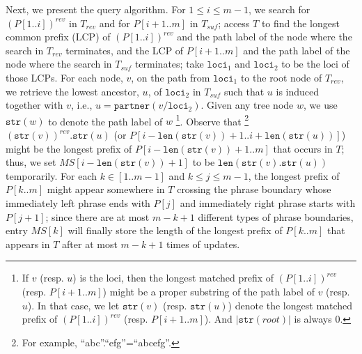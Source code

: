 \documentclass[smallabstract,smallcaptions]{dccpaper}
\def\idtt#1{\ensuremath{\mathtt{#1}}}
\def\str{\idtt{str}}
\def\partner{\idtt{partner}}
\def\loci{\idtt{loci}}
\def\len{\idtt{len}}
\begin{document}
	Next, we present the query algorithm.
	For $1\leq i\leq m-1$, we search for $(P[1..i])^{rev}$ in $T_{rev}$ and for $P[i+1..m]$ in $T_{suf}$; access $T$ to find the longest common prefix (LCP) of $(P[1..i])^{rev}$  and the path label of the node where the search in $T_{rev}$ terminates, and the LCP of $P[i+1..m]$ and the path label of the node where the search in $T_{suf}$ terminates; take $\loci_1$ and $\loci_2$ to be the loci of those LCPs.
	For each node, $v$, on the path from $\loci_1$ to the root node of $T_{rev}$, we retrieve the lowest ancestor, $u$, of $\loci_2$ in $T_{suf}$ such that $u$ is induced together with $v$, i.e., $u=\partner(v/\loci_2)$.
	Given any tree node $w$, we use $\str(w)$ to denote the path label of $w$ \footnote{If $v$ (resp. $u$) is the loci, then the longest matched prefix of $(P[1..i])^{rev}$ (resp. $P[i+1..m]$) might be a proper substring of the path label of $v$ (resp. $u$). In that case, we let $\str(v)$ (resp. $\str(u)$) denote the longest matched prefix of $(P[1..i])^{rev}$ (resp. $P[i+1..m]$). And $|\str(root)|$ is always 0.}.
	Observe that \footnote{For example, ``abc''.``efg''=``abcefg''.} $(\str(v))^{rev}.\str(u)$ (or $P[i-\len(\str(v))+1..i+\len(\str(u))]$) might be the longest prefix of $P[i-\len(\str(v))+1..m]$ that occurs in $T$; thus, we set $MS[i-\len(\str(v))+1]$ to be $\len(\str(v).\str(u))$ temporarily.
	For each $k\in[1..m-1]$ and $k\leq j \leq m-1$, the longest prefix of $P[k..m]$ might appear somewhere in $T$ crossing the phrase boundary whose immediately left phrase ends with $P[j]$ and immediately right phrase starts with $P[j+1]$; since there are at most $m-k+1$ different types of phrase boundaries, entry $MS[k]$ will finally store the length of the longest prefix of $P[k..m]$ that appears in $T$ after at most $m-k+1$ times of updates.
	\renewcommand{\thefootnote}{\fnsymbol{footnote}}
\end{document}
